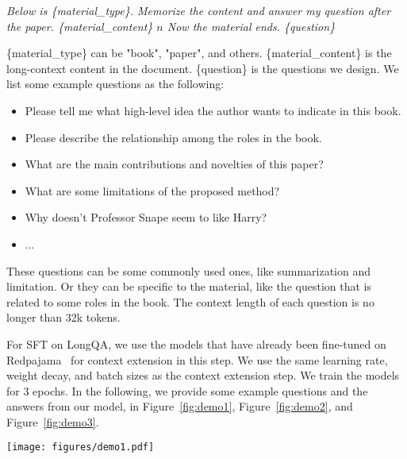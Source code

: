 \documentclass{article} %
\begin{document}
{\em Below is \{material\_type\}. Memorize the content and answer my question after the paper. \{material\_content\} $n$ Now the material ends. \{question\}}

\{material\_type\} can be "book", "paper", and others. \{material\_content\} is the long-context content in the document. \{question\} is the questions we design. We list some example questions as the following:

\begin{itemize}
    \item Please tell me what high-level idea the author wants to indicate in this book.
    \item Please describe the relationship among the roles in the book.
    \item What are the main contributions and novelties of this paper?
    \item What are some limitations of the proposed method?
    \item Why doesn't Professor Snape seem to like Harry?
    \item ...
\end{itemize}
These questions can be some commonly used ones, like summarization and limitation. Or they can be specific to the material, like the question that is related to some roles in the book. The context length of each question is no longer than 32k tokens.

For SFT on LongQA, we use the models that have already been fine-tuned on Redpajama~\citep{together2023redpajama} for context extension in this step. We use the same learning rate, weight decay, and batch sizes as the context extension step. We train the models for 3 epochs. In the following, we provide some example questions and the answers from our model, in Figure~\ref{fig:demo1}, Figure~\ref{fig:demo2}, and Figure~\ref{fig:demo3}.

\newpage
\begin{figure*}[t]
\begin{center}
\texttt{[image: figures/demo1.pdf]}
\end{center}
\caption{Examples on book sections\protect\footnotemark[1]\protect\footnotemark[2]\protect\footnotemark[3] and questions related to abstraction and character. For all these examples, we select the related section in each book with less than 32k tokens.}
\label{fig:demo1}
\end{figure*}
\end{document}
